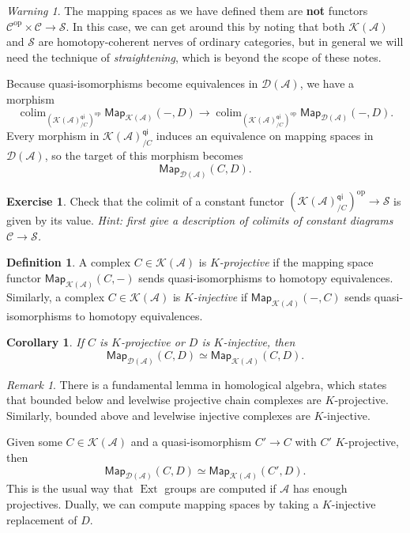 \documentclass[10pt, oneside]{memoir}
\newtheorem{cor}[thm]{Corollary}
\theoremstyle{definition}
\newtheorem{defn}[thm]{Definition}
\newtheorem{exer}[thm]{Exercise}
\theoremstyle{remark}
\newtheorem{rmk}[thm]{Remark}
\newtheorem{warn}[thm]{Warning}
\theoremstyle{plain}
\theoremstyle{definition}
\theoremstyle{remark}
\newcommand{\mc}[1]{\mathcal{#1}}
\newcommand{\ms}[1]{\mathsf{#1}}
\newcommand{\1}{\mathbf{1}}
\newcommand{\2}{\mathbf{2}}
\newcommand{\3}{\mathbf{3}}
\DeclareMathOperator{\Ext}{Ext}
\DeclareMathOperator{\op}{op}
\DeclareMathOperator*{\colim}{colim}
\begin{document}
\begin{warn}
    The mapping spaces as we have defined them are \textbf{not} functors $\mc{C}^{\op} \times \mc{C} \to \mc{S}$. In this case, we can get around this by noting that both $\mc{K}(\mc{A})$ and $\mc{S}$ are homotopy-coherent nerves of ordinary categories, but in general we will need the technique of \textit{straightening}, which is beyond the scope of these notes.
\end{warn}

Because quasi-isomorphisms become equivalences in $\mc{D}(\mc{A})$, we have a morphism
\[ \colim_{(\mc{K}(\mc{A})_{/C}^{\ms{qi}})^{\op}} \ms{Map}_{\mc{K}(\mc{A})}(-, D) \to \colim_{(\mc{K}(\mc{A})_{/C}^{\ms{qi}})^{\op}} \ms{Map}_{\mc{D}(\mc{A})}(-, D). \]
Every morphism in $\mc{K}(\mc{A})_{/C}^{\ms{qi}}$ induces an equivalence on mapping spaces in $\mc{D}(\mc{A})$, so the target of this morphism becomes
\[ \ms{Map}_{\mc{D}(\mc{A})}(C, D). \]

\begin{exer}
    Check that the colimit of a constant functor $(\mc{K}(\mc{A})_{/C}^{\ms{qi}})^{\op} \to \mc{S}$ is given by its value. \textit{Hint: first give a description of colimits of constant diagrams $\mc{C} \to \mc{S}$.}
\end{exer}

\begin{defn}
    A complex $C \in \mc{K}(\mc{A})$ is \textit{$K$-projective} if the mapping space functor $\ms{Map}_{\mc{K}(\mc{A})}(C, -)$ sends quasi-isomorphisms to homotopy equivalences. Similarly, a complex $C \in \mc{K}(\mc{A})$ is \textit{$K$-injective} if $\ms{Map}_{\mc{K}(\mc{A})}(-, C)$ sends quasi-isomorphisms to homotopy equivalences.
\end{defn}

\begin{cor}
    If $C$ is $K$-projective or $D$ is $K$-injective, then 
    \[ \ms{Map}_{\mc{D}(\mc{A})} (C, D) \simeq \ms{Map}_{\mc{K}(\mc{A})}(C, D). \]
\end{cor}

\begin{rmk}
    There is a fundamental lemma in homological algebra, which states that bounded below and levelwise projective chain complexes are $K$-projective. Similarly, bounded above and levelwise injective complexes are $K$-injective.
\end{rmk}

Given some $C \in \mc{K}(\mc{A})$ and a quasi-isomorphism $C' \to C$ with $C'$ $K$-projective, then
\[ \ms{Map}_{\mc{D}(\mc{A})} (C, D) \simeq \ms{Map}_{\mc{K}(\mc{A})} (C', D). \]
This is the usual way that $\Ext$ groups are computed if $\mc{A}$ has enough projectives. Dually, we can compute mapping spaces by taking a $K$-injective replacement of $D$.
\end{document}
